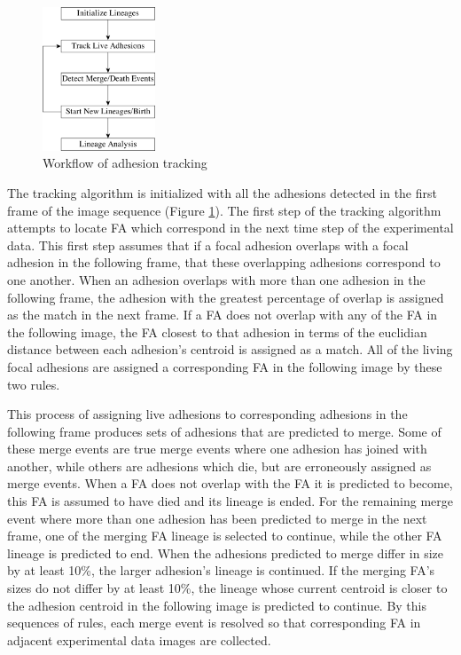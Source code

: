 \documentclass[letterpaper,twocolumn]{article}
\begin{document}
\begin{figure}[htbp]
\begin{center}
\includegraphics[width=0.3\textwidth]{figures/tracking_chart}
\caption{Workflow of adhesion tracking}
\label{tracking_chart}
\end{center}
\end{figure}

The tracking algorithm is initialized with all the adhesions detected in the first frame of the image sequence (Figure \ref{tracking_chart}). The first step of the tracking algorithm attempts to locate FA which correspond in the next time step of the experimental data. This first step assumes that if a focal adhesion overlaps with a focal adhesion in the following frame, that these overlapping adhesions correspond to one another. When an adhesion overlaps with more than one adhesion in the following frame, the adhesion with the greatest percentage of overlap is assigned as the match in the next frame. If a FA does not overlap with any of the FA in the following image, the FA closest to that adhesion in terms of the euclidian distance between each adhesion's centroid is assigned as a match. All of the living focal adhesions are assigned a corresponding FA in the following image by these two rules.

This process of assigning live adhesions to corresponding adhesions in the following frame produces sets of adhesions that are predicted to merge. Some of these merge events are true merge events where one adhesion has joined with another, while others are adhesions which die, but are erroneously assigned as merge events. When a FA does not overlap with the FA it is predicted to become, this FA is assumed to have died and its lineage is ended. For the remaining merge event where more than one adhesion has been predicted to merge in the next frame, one of the merging FA lineage is selected to continue, while the other FA lineage is predicted to end. When the adhesions predicted to merge differ in size by at least 10\%, the larger adhesion's lineage is continued. If the merging FA's sizes do not differ by at least 10\%, the lineage whose current centroid is closer to the adhesion centroid in the following image is predicted to continue. By this sequences of rules, each merge event is resolved so that corresponding FA in adjacent experimental data images are collected.
\end{document}
